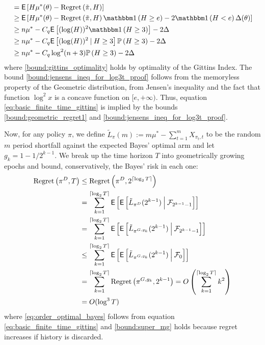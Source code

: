 \begin{myproof}[Proof.]
\begin{align}
	&  = \E\left[H\mu^*(\theta) - \Regret{\tilde \pi, H}\right] \nonumber \\
	& \ge \E\left[H\mu^*(\theta) -\Regret{\tilde \pi, H}\ind{H \ge e} - 2\ind{H < e}\Delta(\theta)\right] \nonumber \\
	& \ge n \mu^* - C_q \Ee{(\log (H))^2 \ind{H \ge 3} } - 2\Delta \nonumber \\
	& \ge n \mu^* - C_q \Ee{(\log (H))^2 \given H \ge 3}\P{H \ge 3} - 2\Delta \nonumber \\
	& \ge n \mu^* - C_q \log^2 (n+3)\P{H \ge 3} - 2\Delta\label{bound:jensens_ineq_for_log3t_proof}
	\end{align}
	where \eqref{bound:gittins_optimality} holds by optimality of the Gittins Index. The bound \eqref{bound:jensens_ineq_for_log3t_proof} follows from the memoryless property of the Geometric distribution, from Jensen's inequality and the fact that function $\log^2 x$ is a concave function on $[e,+\infty)$. Thus, equation \eqref{eq:basic_finite_time_gittins} is implied by the bounds \eqref{bound:geometric_regret1} and \eqref{bound:jensens_ineq_for_log3t_proof}.
	
	Now, for any policy $\pi$, we define $\tilde L_\pi(m) := m\mu^* - \sum_{t=1}^m X_{\pi_t,t}$ to be the random $m$ period shortfall against the expected Bayes' optimal arm and let $g_k = 1 - 1/2^{k-1}$. We break up the time horizon $T$ into geometrically growing epochs and bound, conservatively, the Bayes' risk in each one:
	\begin{align}
	\Regret{\pi^D, T} & \le \Regret{\pi^D, 2^{\ceil{\log_2 T}}}\\
	& = \sum_{k=1}^{\ceil{\log_2 T}} \Ee{\Ee{ \tilde L_{\pi^D}(2^{k-1}) \given[\Big] \mathcal F_{2^{k-1}-1}}} \nonumber \\
	& =\sum_{k=1}^{\ceil{\log_2 T}} \Ee{\Ee{ \tilde L_{\pi^{G, g_k}}(2^{k-1}) \given[\Big] \mathcal F_{2^{k-1}-1}}} \nonumber \\
	& \le \sum_{k=1}^{\ceil{\log_2 T}} \Ee{\Ee{ \tilde L_{\pi^{G,g_k}}(2^{k-1}) \given[\Big] \mathcal F_{0}}} \label{bound:super_mg} \\
	& = \sum_{k=1}^{\ceil{\log_2 T}} \Regret{\pi^{G, g_k}, 2^{k-1}} =  O\left(\sum_{k=1}^{\ceil{\log_2 T}} k^2 \right)\label{eq:order_optimal_bayes} \\
	& = O(\log^3 T) \nonumber
	\end{align}
	where \eqref{eq:order_optimal_bayes} follows from equation \eqref{eq:basic_finite_time_gittins} and \eqref{bound:super_mg} holds because regret increases if history is discarded.
\end{myproof}

